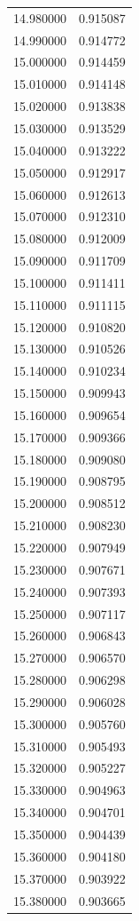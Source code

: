 \begin{tabular}{rr}
14.980000 & 0.915087 \\
14.990000 & 0.914772 \\
15.000000 & 0.914459 \\
15.010000 & 0.914148 \\
15.020000 & 0.913838 \\
15.030000 & 0.913529 \\
15.040000 & 0.913222 \\
15.050000 & 0.912917 \\
15.060000 & 0.912613 \\
15.070000 & 0.912310 \\
15.080000 & 0.912009 \\
15.090000 & 0.911709 \\
15.100000 & 0.911411 \\
15.110000 & 0.911115 \\
15.120000 & 0.910820 \\
15.130000 & 0.910526 \\
15.140000 & 0.910234 \\
15.150000 & 0.909943 \\
15.160000 & 0.909654 \\
15.170000 & 0.909366 \\
15.180000 & 0.909080 \\
15.190000 & 0.908795 \\
15.200000 & 0.908512 \\
15.210000 & 0.908230 \\
15.220000 & 0.907949 \\
15.230000 & 0.907671 \\
15.240000 & 0.907393 \\
15.250000 & 0.907117 \\
15.260000 & 0.906843 \\
15.270000 & 0.906570 \\
15.280000 & 0.906298 \\
15.290000 & 0.906028 \\
15.300000 & 0.905760 \\
15.310000 & 0.905493 \\
15.320000 & 0.905227 \\
15.330000 & 0.904963 \\
15.340000 & 0.904701 \\
15.350000 & 0.904439 \\
15.360000 & 0.904180 \\
15.370000 & 0.903922 \\
15.380000 & 0.903665 \\

\end{tabular}
